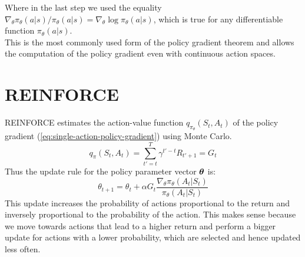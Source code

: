 Where in the last step we used the equality $\nabla_{\theta} \pi_{\theta}(a|s) / \pi_{\theta}(a|s) = \nabla_{\theta} \log \pi_{\theta}(a|s)$, which is true for any differentiable function $\pi_{\theta}(a|s)$.\\ This is the most commonly used form of the policy gradient theorem and allows the computation of the policy gradient even with continuous action spaces.

\section{REINFORCE}
REINFORCE estimates the action-value function $q_{\pi_{\theta}}(S_t, A_t)$ of the policy gradient (\ref{eq:single-action-policy-gradient}) using Monte Carlo.
\begin{equation}
    q_{\pi}(S_t, A_t) = \sum_{t'=t}^T \gamma^{t'-t} R_{t' + 1} = G_t
\end{equation}
Thus the update rule for the policy parameter vector $\boldsymbol{\theta}$ is:
\begin{equation}
    \theta_{t+1} = \theta_t + \alpha G_t \frac{\nabla_{\theta} \pi_{\theta}(A_t|S_t)}{\pi_{\theta}(A_t|S_t)}
    \label{eq:reinforce-update}
\end{equation}
This update increases the probability of actions proportional to the return and inversely proportional to the probability of the action. This makes sense because we move towards actions that lead to a higher return and perform a bigger update for actions with a lower probability, which are selected and hence updated less often.

